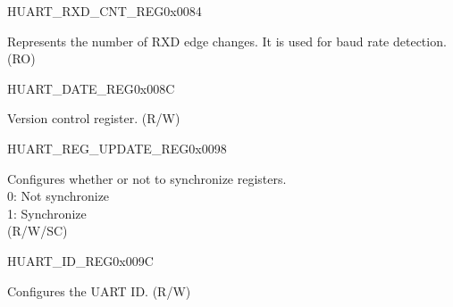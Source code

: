 \begin{register}{H}{UART\_RXD\_CNT\_REG}{0x0084}\label{regdesc:UARTRXDCNTREG}
%
%
\regnewline%
\begin{regdesc}\begin{reglist}
\label{fielddesc:UARTRXDEDGECNT}\item [UART\_RXD\_EDGE\_CNT] Represents the number of RXD edge changes. It is used for baud rate detection. (RO)
\end{reglist}\end{regdesc}
\end{register}


\begin{register}{H}{UART\_DATE\_REG}{0x008C}\label{regdesc:UARTDATEREG}
%
\regnewline%
\begin{regdesc}\begin{reglist}
\label{fielddesc:UARTDATE}\item [UART\_DATE] Version control register. (R/W)
\end{reglist}\end{regdesc}
\end{register}


\begin{register}{H}{UART\_REG\_UPDATE\_REG}{0x0098}\label{regdesc:UARTREGUPDATEREG}
%
%
\regnewline%
\begin{regdesc}\begin{reglist}
\label{fielddesc:UARTREGUPDATE}\item [UART\_REG\_UPDATE] Configures whether or not to synchronize registers.\\
0: Not synchronize\\
1: Synchronize\\(R/W/SC)
\end{reglist}\end{regdesc}
\end{register}


\begin{register}{H}{UART\_ID\_REG}{0x009C}\label{regdesc:UARTIDREG}
%
\regnewline%
\begin{regdesc}\begin{reglist}
\label{fielddesc:UARTID}\item [UART\_ID] Configures the UART ID. (R/W)
\end{reglist}\end{regdesc}
\end{register}


